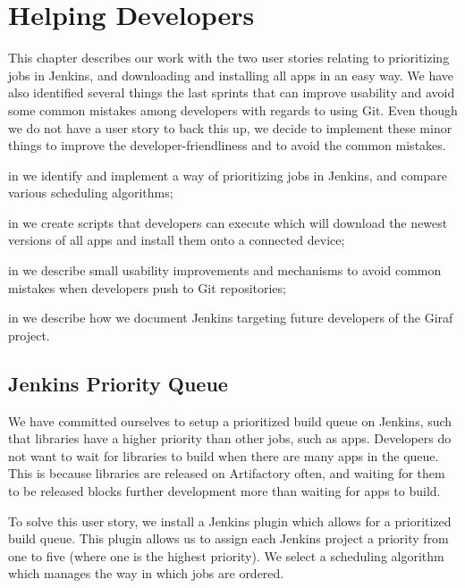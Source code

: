 \chapter{Helping Developers}
This chapter describes our work with the two user stories relating to prioritizing jobs in Jenkins, and downloading and installing all apps in an easy way. We have also identified several things the last sprints that can improve usability and avoid some common mistakes among developers with regards to using Git. Even though we do not have a user story to back this up, we decide to implement these minor things to improve the developer-friendliness and to avoid the common mistakes.

\begin{chapterorganization}
  \item in  we identify and implement a way of prioritizing jobs in Jenkins, and compare various scheduling algorithms;
  \item in  we create scripts that developers can execute which will download the newest versions of all apps and install them onto a connected device;
  \item in  we describe small usability improvements and mechanisms to avoid common mistakes when developers push to Git repositories;
  \item in  we describe how we document Jenkins targeting future developers of the Giraf project.
\end{chapterorganization}

\section{Jenkins Priority Queue}\label{sec:jenkins_prio_queue}
We have committed ourselves to setup a prioritized build queue on Jenkins, such that libraries have a higher priority than other jobs, such as apps. Developers do not want to wait for libraries to build when there are many apps in the queue. This is because libraries are released on Artifactory often, and waiting for them to be released blocks further development more than waiting for apps to build.

To solve this user story, we install a Jenkins plugin \parencite{jenkins-priority-plugin} which allows for a prioritized build queue. This plugin allows us to assign each Jenkins project a priority from one to five (where one is the highest priority). We select a scheduling algorithm which manages the way in which jobs are ordered.

